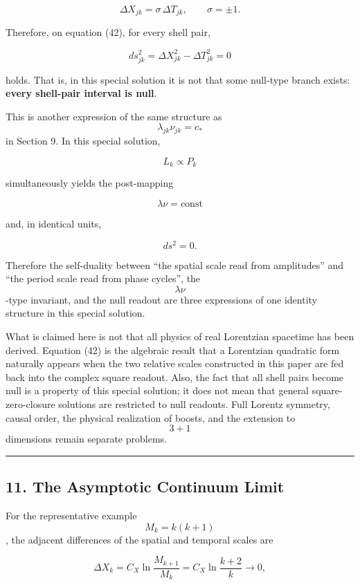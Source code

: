 \documentclass[
  a4paper,
]{article}
\begin{document}
\[
\Delta X_{jk}
=
\sigma\,\Delta T_{jk},
\qquad
\sigma=\pm1.
\]

Therefore, on equation (42), for every shell pair,

\[
\boxed{
ds_{jk}^2
=
\Delta X_{jk}^2-\Delta T_{jk}^2
=0
}
\tag{44}
\]

holds. That is, in this special solution it is not that some null-type
branch exists: \textbf{every shell-pair interval is null}.

This is another expression of the same structure as
\[\lambda_{jk}\nu_{jk}=c_*\] in Section 9. In this special solution,

\[
L_k\propto P_k
\]

simultaneously yields the post-mapping

\[
\lambda\nu=\mathrm{const}
\]

and, in identical units,

\[
ds^2=0.
\]

Therefore the self-duality between ``the spatial scale read from
amplitudes'' and ``the period scale read from phase cycles'', the
\[\lambda\nu\]-type invariant, and the null readout are three
expressions of one identity structure in this special solution.

What is claimed here is not that all physics of real Lorentzian
spacetime has been derived. Equation (42) is the algebraic result that a
Lorentzian quadratic form naturally appears when the two relative scales
constructed in this paper are fed back into the complex square readout.
Also, the fact that all shell pairs become null is a property of this
special solution; it does not mean that general square-zero-closure
solutions are restricted to null readouts. Full Lorentz symmetry, causal
order, the physical realization of boosts, and the extension to \[3+1\]
dimensions remain separate problems.

\begin{center}\rule{0.5\linewidth}{0.5pt}\end{center}

\subsection{11. The Asymptotic Continuum
Limit}\label{the-asymptotic-continuum-limit}

For the representative example \[M_k=k(k+1)\], the adjacent differences
of the spatial and temporal scales are

\[
\Delta X_k
=
C_X\ln\frac{M_{k+1}}{M_k}
=
C_X\ln\frac{k+2}{k}
\longrightarrow0,
\tag{45}
\]
\end{document}
